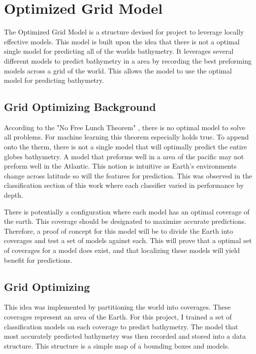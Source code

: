 \section{Optimized Grid Model}
\setlength{\parindent}{10ex}
The Optimized Grid Model is a structure devised for project to leverage locally effective models.
This model is built upon the idea that there is not a optimal single model for predicting all of the worlds bathymetry.
It leverages several different models to predict bathymetry in a area by recording the best preforming models across a grid of the world.
This allows the model to use the optimal model for predicting bathymetry.

\subsection{Grid Optimizing Background}
According to the "No Free Lunch Theorem" \cite{wolpert1997no}, there is no optimal model to solve all problems.
For machine learning this theorem especially holds true.
To append onto the therm, there is not a single model that will optimally predict the entire globes bathymetry.
A model that preforms well in a area of the pacific may not preform well in the Atlantic.
This notion is intuitive as Earth's environments change across latitude so will the features for prediction.
This was observed in the classification section of this work where each classifier varied in performance by depth.

\par
There is potentially a configuration where each model has an optimal coverage of the earth.
This coverage should be designated to maximize accurate predictions.
Therefore, a proof of concept for this model will be to divide the Earth into coverages and test a set of models against each.
This will prove that a optimal set of coverages for a model does exist, and that localizing these models will yield benefit for predictions.

\subsection{Grid Optimizing}
This idea was implemented by partitioning the world into coverages.
These coverages represent an area of the Earth.
For this project, I trained a set of classification models on each coverage to predict bathymetry.
The model that most accurately predicted bathymetry was then recorded and stored into a data structure.
This structure is a simple map of a bounding boxes and models.

